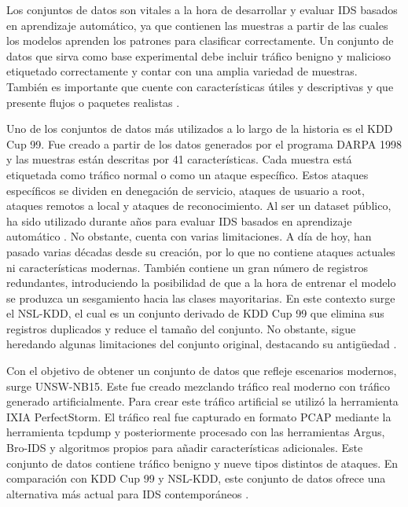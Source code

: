 Los conjuntos de datos son vitales a la hora de desarrollar y evaluar IDS basados en aprendizaje automático, ya que contienen las muestras a partir de las cuales los modelos aprenden los patrones para clasificar correctamente. Un conjunto de datos que sirva como base experimental debe incluir tráfico benigno y malicioso etiquetado correctamente y contar con una amplia variedad de muestras. También es importante que cuente con características útiles y descriptivas y que presente flujos o paquetes realistas \cite{sharafaldin2018cicids2017}.

Uno de los conjuntos de datos más utilizados a lo largo de la historia es el KDD Cup 99. Fue creado a partir de los datos generados por el programa DARPA 1998 y las muestras están descritas por 41 características. Cada muestra está etiquetada como tráfico normal o como un ataque específico. Estos ataques específicos se dividen en denegación de servicio, ataques de usuario a root, ataques remotos a local y ataques de reconocimiento. Al ser un dataset público, ha sido utilizado durante años para evaluar IDS basados en aprendizaje automático \cite{tavallaee2009kdd,buczak2016survey}. No obstante, cuenta con varias limitaciones. A día de hoy, han pasado varias décadas desde su creación, por lo que no contiene ataques actuales ni características modernas. También contiene un gran número de registros redundantes, introduciendo la posibilidad de que a la hora de entrenar el modelo se produzca un sesgamiento hacia las clases mayoritarias. En este contexto surge el NSL-KDD, el cual es un conjunto derivado de KDD Cup 99 que elimina sus registros duplicados y reduce el tamaño del conjunto. No obstante, sigue heredando algunas limitaciones del conjunto original, destacando su antigüedad \cite{tavallaee2009kdd,moustafa2015unswnb15}.

Con el objetivo de obtener un conjunto de datos que refleje escenarios modernos, surge UNSW-NB15. Este fue creado mezclando tráfico real moderno con tráfico generado artificialmente. Para crear este tráfico artificial se utilizó la herramienta IXIA PerfectStorm. El tráfico real fue capturado en formato PCAP mediante la herramienta tcpdump y posteriormente procesado con las herramientas Argus, Bro-IDS y algoritmos propios para añadir características adicionales. Este conjunto de datos contiene tráfico benigno y nueve tipos distintos de ataques. En comparación con KDD Cup 99 y NSL-KDD, este conjunto de datos ofrece una alternativa más actual para IDS contemporáneos \cite{moustafa2015unswnb15}.

